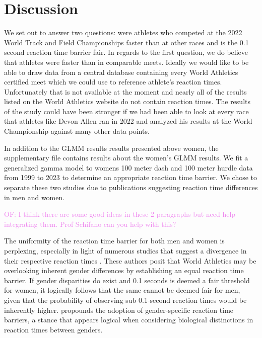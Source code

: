 \documentclass[12pt, letterpaper]{article}
\newcommand{\of}[1]{\textcolor{violet}{OF: #1}}
\begin{document}
\section{Discussion}\label{sec:concludingremarks}

We set out to answer two questions: were athletes who competed at the 2022 World
Track and Field Championships faster than at other races and is the 0.1 second
reaction time barrier fair.  In regards to the first question, we do believe
that athletes were faster than in comparable meets.  Ideally we would like to
be able to draw data from a central database containing every World Athletics
certified meet which we could use to reference athlete's reaction times.
Unfortunately that is not available at the moment and nearly all of the results
listed on the World Athletics website do not contain reaction times.  The results
of the study could have been stronger if we had been able to look at every race
that athletes like Devon Allen ran in 2022 and analyzed his results at the World
Championship against many other data points.

In addition to the GLMM results results presented above women, the supplementary
file contains results about the women's GLMM results.  We fit a generalized
gamma model to womens 100 meter dash and 100 meter hurdle data from 1999 to 2023
to determine an appropriate reaction time barrier.  We chose to separate these
two studies due to publications suggesting reaction time differences in men and
women.

\of{I think there are some good ideas in these 2 paragraphs but need help
integrating them. Prof Schifano can you help with this?}

The uniformity of the reaction time barrier for both men and women is
perplexing, especially in light of numerous studies that suggest a divergence in
their respective reaction times \citep[e.g.,][]{lipps2011implications,
  babicc2009reaction, panoutsakopoulos2020gender}. These authors posit that
World Athletics may be overlooking inherent gender differences by establishing
an equal reaction time barrier. If gender disparities do exist and 0.1 seconds
is deemed a fair threshold for women, it logically follows that the same cannot
be deemed fair for men, given that the probability of observing sub-0.1-second
reaction times would be inherently higher. \citet{brosnan2017effects} propounds
the adoption of gender-specific reaction time barriers, a stance that appears
logical when considering biological distinctions in reaction times between
genders.
\end{document}
